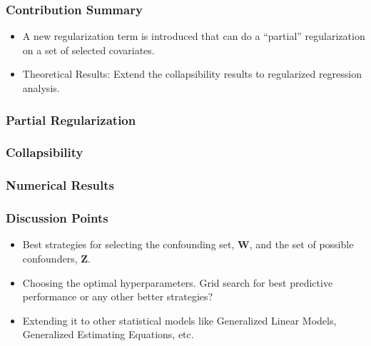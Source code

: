 \documentclass{beamer}
\begin{document}
\begin{frame}
	\frametitle{Contribution Summary}
	\begin{itemize}
		\item A new regularization term is introduced that can do a
			``partial'' regularization on a set of selected
			covariates.
		\item Theoretical Results: Extend the collapsibility results to
			regularized regression analysis.
	\end{itemize}
\end{frame}

\begin{frame}
	\frametitle{Partial Regularization}
\end{frame}

\begin{frame}
	\frametitle{Collapsibility}
\end{frame}

\begin{frame}
	\frametitle{Numerical Results}
\end{frame}

\begin{frame}
	\frametitle{Discussion Points}
	\begin{itemize}
		\item Best strategies for selecting the confounding set, $
			\bm{W} $, and the set of possible confounders, $ \bm{Z}
			$.
		\item Choosing the optimal hyperparameters. Grid search for best 
			predictive performance or any other better strategies?
		\item Extending it to other statistical models like Generalized
			Linear Models, Generalized Estimating Equations, etc.
	\end{itemize}
\end{frame}
\end{document}
